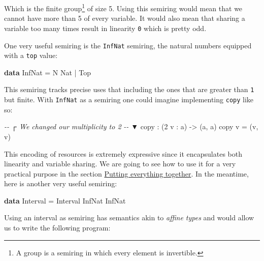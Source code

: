 \documentclass[
]{article}
\newenvironment{Shaded}{}{}
\newcommand{\CommentTok}[1]{\textcolor[rgb]{0.38,0.63,0.69}{\textit{#1}}}
\newcommand{\DataTypeTok}[1]{\textcolor[rgb]{0.56,0.13,0.00}{#1}}
\newcommand{\DecValTok}[1]{\textcolor[rgb]{0.25,0.63,0.44}{#1}}
\newcommand{\KeywordTok}[1]{\textcolor[rgb]{0.00,0.44,0.13}{\textbf{#1}}}
\newcommand{\NormalTok}[1]{#1}
\newcommand{\OperatorTok}[1]{\textcolor[rgb]{0.40,0.40,0.40}{#1}}
\newcommand{\OtherTok}[1]{\textcolor[rgb]{0.00,0.44,0.13}{#1}}
\begin{document}
Which is the finite group\footnote{A group is a semiring in which every
  element is invertible.} of size 5. Using this semiring would mean that
we cannot have more than 5 of every variable. It would also mean that
sharing a variable too many times result in linearity \texttt{0} which
is pretty odd.

One very useful semiring is the \texttt{InfNat} semiring, the natural
numbers equipped with a \texttt{top} value:

\begin{Shaded}
\begin{Highlighting}[]
\KeywordTok{data} \DataTypeTok{InfNat} \OtherTok{=} \DataTypeTok{N} \DataTypeTok{Nat} \OperatorTok{|} \DataTypeTok{Top}
\end{Highlighting}
\end{Shaded}

This semiring tracks precise uses that including the ones that are
greater than \texttt{1} but finite. With \texttt{InfNat} as a semiring
one could imagine implementing \texttt{copy} like so:

\begin{Shaded}
\begin{Highlighting}[]
\CommentTok{{-}{-}      ┌ We changed our multiplicity to 2}
\CommentTok{{-}{-}      ▼}
\NormalTok{copy }\OperatorTok{:}\NormalTok{ (}\DecValTok{2}\NormalTok{ v }\OperatorTok{:}\NormalTok{ a) }\OtherTok{{-}\textgreater{}}\NormalTok{ (a, a)}
\NormalTok{copy v }\OtherTok{=}\NormalTok{ (v, v)}
\end{Highlighting}
\end{Shaded}

This encoding of resources is extremely expressive since it encapsulates
both linearity and variable sharing. We are going to see how to use it
for a very practical purpose in the section
\protect\hyperlink{putting-everything-together}{Putting everything
together}. In the meantime, here is another very useful semiring:

\begin{Shaded}
\begin{Highlighting}[]
\KeywordTok{data} \DataTypeTok{Interval} \OtherTok{=} \DataTypeTok{Interval} \DataTypeTok{InfNat} \DataTypeTok{InfNat}
\end{Highlighting}
\end{Shaded}

Using an interval as semiring has semantics akin to \emph{affine types}
and would allow us to write the following program:
\end{document}
